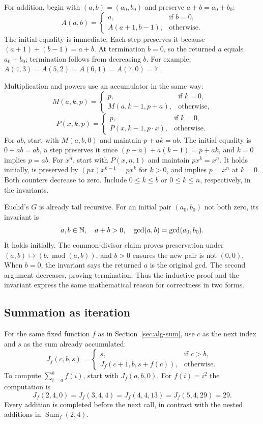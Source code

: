 For addition, begin with $(a,b)=(a_0,b_0)$ and preserve $a+b=a_0+b_0$:
\[
A(a,b)=\begin{cases}
a,&\text{if }b=0,\\
A(a+1,b-1),&\text{otherwise}.
\end{cases}
\]
The initial equality is immediate. Each step preserves it because
$(a+1)+(b-1)=a+b$. At termination $b=0$, so the returned $a$ equals
$a_0+b_0$; termination follows from decreasing $b$.
For example, $A(4,3)=A(5,2)=A(6,1)=A(7,0)=7$.

Multiplication and powers use an accumulator in the same way:
\[
M(a,k,p)=\begin{cases}
p,&\text{if }k=0,\\
M(a,k-1,p+a),&\text{otherwise},
\end{cases}
\]
\[
P(x,k,p)=\begin{cases}
p,&\text{if }k=0,\\
P(x,k-1,p\cdot x),&\text{otherwise}.
\end{cases}
\]
For $ab$, start with $M(a,b,0)$ and maintain $p+ak=ab$.
The initial equality is $0+ab=ab$, a step preserves it since
$(p+a)+a(k-1)=p+ak$, and $k=0$ implies $p=ab$.
For $x^n$, start with $P(x,n,1)$ and maintain $px^k=x^n$.
It holds initially, is preserved by $(px)x^{k-1}=px^k$ for $k>0$, and
implies $p=x^n$ at $k=0$. Both counters decrease to zero. Include
$0\leq k\leq b$ or $0\leq k\leq n$, respectively, in the invariants.

Euclid's $G$ is already tail recursive. For an initial pair $(a_0,b_0)$
not both zero, its invariant is
\[
a,b\in\mathbb{N},\quad a+b>0,\quad \gcd(a,b)=\gcd(a_0,b_0).
\]
It holds initially. The common-divisor claim proves preservation under
$(a,b)\mapsto(b,\operatorname{mod}(a,b))$, and $b>0$ ensures the new pair
is not $(0,0)$. When $b=0$, the invariant says the returned $a$ is the
original gcd. The second argument decreases, proving termination. Thus the
inductive proof and the invariant express the same mathematical reason for
correctness in two forms.

\subsection{Summation as iteration}
\label{sec:alg-sum-iteration}

For the same fixed function $f$ as in Section~\ref{sec:alg-sum}, use $c$ as
the next index and $s$ as the sum already accumulated:
\[
J_f(c,b,s)=\begin{cases}
s,&\text{if }c>b,\\
J_f(c+1,b,s+f(c)),&\text{otherwise}.
\end{cases}
\]
To compute $\sum_{i=a}^{b}f(i)$, start with $J_f(a,b,0)$.
For $f(i)=i^2$ the computation is
\[
J_f(2,4,0)=J_f(3,4,4)=J_f(4,4,13)=J_f(5,4,29)=29.
\]
Every addition is completed before the next call, in contrast with the
nested additions in $\operatorname{Sum}_f(2,4)$.


